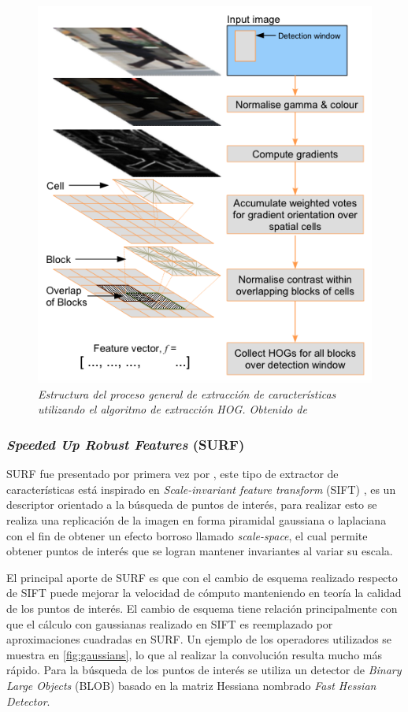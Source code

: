 \begin{figure}[tp]
  \centering
  \includegraphics[scale=.6]{images/hogprocess}
  \caption{\em Estructura del proceso general de extracción de características utilizando el algoritmo de extracción HOG. Obtenido de \cite{dalal2006}}  
  \label{fig:hogscheme}
\end{figure}

\subsubsection{\textit{Speeded Up Robust Features} (SURF)}

SURF fue presentado por primera vez por \cite{Bay2006}, este tipo de extractor de características está inspirado en \textit{Scale-invariant feature transform} (SIFT) \citep{Lowe2004}, es un descriptor orientado a la búsqueda de puntos de interés, para realizar esto se realiza una replicación de la imagen en forma piramidal gaussiana o laplaciana con el fin de obtener un efecto borroso llamado \textit{scale-space}, el cual permite obtener puntos de interés que se logran mantener invariantes al variar su escala. 

El principal aporte de SURF es que con el cambio de esquema realizado respecto de SIFT puede mejorar la velocidad de cómputo manteniendo en teoría la calidad de los puntos de interés. El cambio de esquema tiene relación principalmente con que el cálculo con gaussianas realizado en SIFT es reemplazado por aproximaciones cuadradas en SURF. Un ejemplo de los operadores utilizados se muestra en \ref{fig:gaussians}, lo que al realizar la convolución resulta mucho más rápido. Para la búsqueda de los puntos de interés se utiliza un detector de \textit{Binary Large Objects} (BLOB) basado en la matriz Hessiana nombrado \textit{Fast Hessian Detector}.

